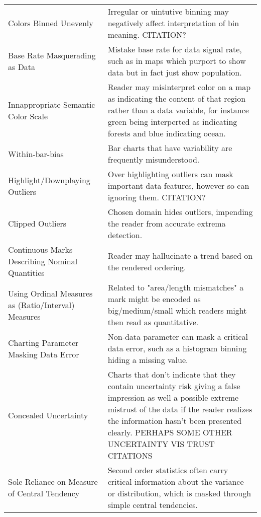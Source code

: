\begin{table*}[]
\begin{tabular}{p{5cm}p{12cm}}
 \rowcolor{colorc}Colors Binned Unevenly & Irregular or uintutive binning may negatively affect interpretation of bin meaning. CITATION?\\
 \rowcolor{colorc-opaque}Base Rate Masquerading as Data & Mistake base rate for data signal rate, such as in maps which purport to show data but in fact just show population. \cite{correll2016surprise}\\
 \rowcolor{colorc}Innappropriate Semantic Color Scale  & Reader may misinterpret color on a map as indicating the content of that region rather than a data variable, for instance green being interperted as indicating forests and blue indicating ocean. \\
 \rowcolor{colorc-opaque}Within-bar-bias & Bar charts that have variability are frequently misunderstood. \cite{newman2012bar}\\
 \rowcolor{colorc}Highlight/Downplaying Outliers & Over highlighting outliers can mask important data features, however so can ignoring them. CITATION?\\
 \rowcolor{colorc-opaque}Clipped Outliers & Chosen domain hides outliers, impending the reader from accurate extrema detection. \\
 \rowcolor{colorc}Continuous Marks Describing Nominal Quantities & Reader may hallucinate a trend based on the rendered ordering. \cite{kindlmann2014algebraic, mcnuttlinting}\\
 \rowcolor{colorc-opaque}Using Ordinal Measures as (Ratio/Interval) Measures & Related to "area/length mismatches" a mark might be encoded as big/medium/small which readers might then read as quantitative. \cite{stevens1946theory, few2019loom}\\
 \rowcolor{colorc}Charting Parameter Masking Data Error & Non-data parameter can mask a critical data error, such as a histogram binning hiding a missing value. \cite{correll2018looks}\\
 \rowcolor{colorc-opaque}Concealed Uncertainty & Charts that don't indicate that they contain uncertainty risk giving a false impression as well a possible extreme mistrust of the data if the reader realizes the information hasn't been presented clearly. PERHAPS SOME OTHER UNCERTAINTY VIS TRUST CITATIONS \cite{song2018s}\\
 \rowcolor{colorc}Sole Reliance on Measure of Central Tendency & Second order statistics often carry critical information about the variance or distribution, which is masked through simple central tendencies.  \cite{wall2017warning, few2019loom, matejka2017same, anscombe1973graphs}\\

\end{tabular}
\end{table*}
